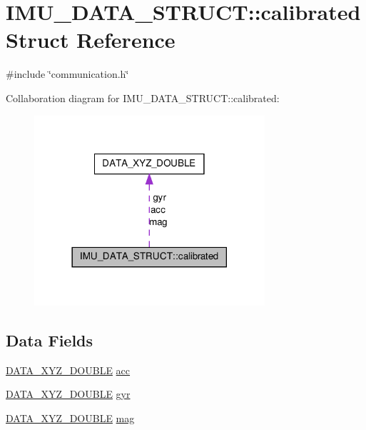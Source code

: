 \hypertarget{structIMU__DATA__STRUCT_1_1calibrated}{\section{I\-M\-U\-\_\-\-D\-A\-T\-A\-\_\-\-S\-T\-R\-U\-C\-T\-:\-:calibrated Struct Reference}
\label{structIMU__DATA__STRUCT_1_1calibrated}
}


{\ttfamily \#include \char`\"{}communication.\-h\char`\"{}}



Collaboration diagram for I\-M\-U\-\_\-\-D\-A\-T\-A\-\_\-\-S\-T\-R\-U\-C\-T\-:\-:calibrated\-:
\nopagebreak
\begin{figure}[H]
\begin{center}
\leavevmode
\includegraphics[width=242pt]{structIMU__DATA__STRUCT_1_1calibrated__coll__graph}
\end{center}
\end{figure}
\subsection*{Data Fields}
\begin{DoxyCompactItemize}
\item 
\hyperlink{structDATA__XYZ__DOUBLE}{D\-A\-T\-A\-\_\-\-X\-Y\-Z\-\_\-\-D\-O\-U\-B\-L\-E} \hyperlink{structIMU__DATA__STRUCT_1_1calibrated_a281a7fdb40a05ed97388f18b9bb90c81}{acc}
\item 
\hyperlink{structDATA__XYZ__DOUBLE}{D\-A\-T\-A\-\_\-\-X\-Y\-Z\-\_\-\-D\-O\-U\-B\-L\-E} \hyperlink{structIMU__DATA__STRUCT_1_1calibrated_a8a54aded6ce608f1b7d2b4a0c52c248b}{gyr}
\item 
\hyperlink{structDATA__XYZ__DOUBLE}{D\-A\-T\-A\-\_\-\-X\-Y\-Z\-\_\-\-D\-O\-U\-B\-L\-E} \hyperlink{structIMU__DATA__STRUCT_1_1calibrated_a2fde6c6759e0fda17e272c32096cb9ec}{mag}
\end{DoxyCompactItemize}


